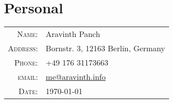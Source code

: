 \section{Personal}
\begin{tabular}
	{rl}
	\textsc{Name:} &  Aravinth Panch \\
	\textsc{Address:} & Bornstr. 3, 12163 Berlin, Germany\\
	\textsc{Phone:} & +49 176 31173663\\
	\textsc{email:} & \href{mailto:me@aravinth.info}{me@aravinth.info} \\
	\textsc{Date:} & \today\\
\end{tabular}
